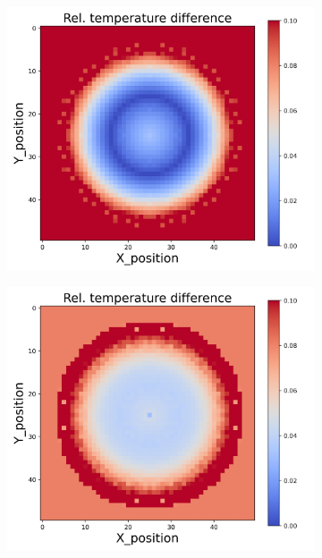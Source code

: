 {\begin{figure}[h]
\begin{minipage}{\textwidth}
\begin{subfigure}{0.27\textwidth}
        \end{subfigure}
        \begin{subfigure}{0.27\textwidth}
            \centering
            \includegraphics[width=\textwidth]{figures/raw_data/23/lin_square/T_bias.jpg}
        \end{subfigure}
        \begin{subfigure}{0.27\textwidth}
            \centering
            \includegraphics[width=\textwidth]{figures/raw_data/24/lin_square/T_bias.jpg}

\end{subfigure}
\end{minipage}
\end{figure}}
